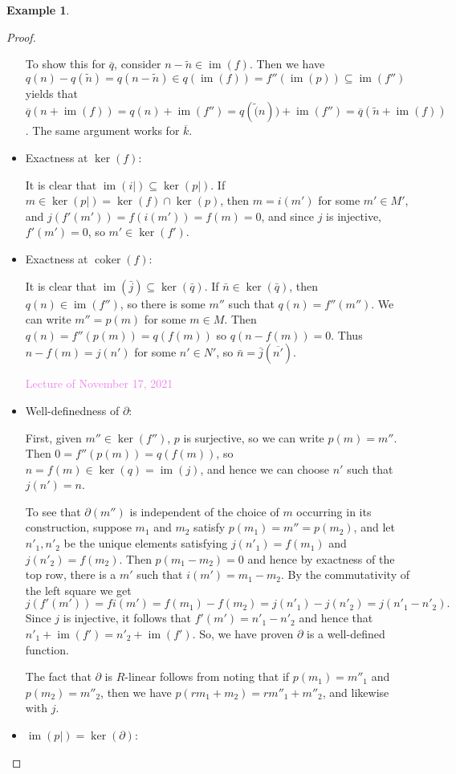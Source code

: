 \documentclass{amsart}[12pt]
\def\image{\operatorname{im}}
\def\im{\image}
\def\ker{\operatorname{ker}}
\def\coker{\operatorname{coker}}
\newcommand{\Nov}[1]{\textcolor{violet}{Lecture of November #1, 2021}}
\def\ov#1{{\overline{#1}}}
\numberwithin{equation}{section}
\theoremstyle{plain} %
\theoremstyle{definition}
\newtheorem{ex}[equation]{Example}
\theoremstyle{remark}
\def\ov#1{\overline{#1}}
\begin{document}
\begin{ex}
\begin{proof}
\begin{itemize}
To show this for $\ov{q}$, consider $n-\tilde{n}\in \im(f)$. Then we have $q(n)-q(\tilde{n})=q(n-\tilde{n})\in q(\im(f))=f''(\im(p))\subseteq \im(f'')$ yields that $\ov{q}(n + \im(f))=q(n) + \im(f'')=q(\tilde(n))+  \im(f'')=\ov{q}(\tilde{n} + \im(f))$. The same argument works for $\ov{k}$.

\item Exactness at $\ker(f)$: 

 It is clear that $\im(i|)\subseteq \ker(p|)$. If $m\in \ker(p|)= \ker(f) \cap \ker(p)$, then $m=i(m')$ for some $m'\in M'$, and $j(f'(m'))=f(i(m'))=f(m)=0$, and since $j$ is injective, $f'(m')=0$, so $m'\in \ker(f')$.

\item Exactness at $\coker(f)$: 

It is clear that $\im(\bar{j})\subseteq\ker(\bar{q})$. If $\bar{n}\in \ker(\bar{q})$, then $q(n)\in \im(f'')$, so there is some $m''$ such that $q(n)=f''(m'')$. We can write $m''=p(m)$ for some $m\in M$. Then $q(n) = f''(p(m))=q(f(m))$ so $q(n-f(m))=0$. Thus $n-f(m) = j(n')$ for some $n'\in N'$, so $\bar{n} = \bar{j}(\ov{n'})$.

\Nov{17}

\item Well-definedness of $\partial$:

First, given $m''\in \ker(f'')$, $p$ is surjective, so we can write $p(m)=m''$. Then $0=f''(p(m))=q(f(m))$, so $n=f(m)\in \ker(q)=\im(j)$, and hence we can choose $n'$ such that $j(n')=n$.

To see that $\partial(m'')$ is independent of the choice of $m$ occurring in its construction, suppose $m_1$ and $m_2$ 
satisfy $p(m_1) = m'' = p(m_2)$, and let $n'_1, n'_2$ be the unique elements satisfying $j(n'_1) = f(m_1)$ and $j(n'_2) = f(m_2)$.
Then $p(m_1 - m_2) = 0$ and hence by exactness of the top row, there is a $m'$ such that $i(m') = m_1 - m_2$. By
the commutativity of the left square we get
$$
j(f'(m')) = fi(m') = f(m_1) - f(m_2) = j(n'_1) - j(n'_2) = j(n'_1 - n'_2).
$$
Since $j$ is injective, it follows that $f'(m') = n'_1 - n'_2$ and hence that $n'_1 + \im(f') = n'_2 + \im(f')$.
So, we have proven $\partial$ is a well-defined function. 

The fact that $\partial$ is $R$-linear follows from  noting that if $p(m_1) = m''_1$ and $p(m_2)=m''_2$, then we have $p(rm_1 + m_2) = rm''_1 + m''_2$, and likewise with $j$.

\item $\im(p|) = \ker(\partial)$:


\end{itemize}
\end{proof}
\end{ex}
\end{document}
